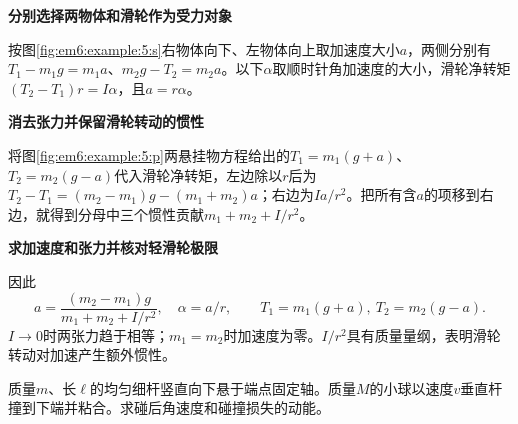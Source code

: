 \begin{solution}\textbf{分别选择两物体和滑轮作为受力对象}\par\nobreak
按图\ref{fig:em6:example:5:s}右物体向下、左物体向上取加速度大小$a$，两侧分别有$T_1-m_1g=m_1a$、$m_2g-T_2=m_2a$。以下$\alpha$取顺时针角加速度的大小，滑轮净转矩$(T_2-T_1)r=I\alpha$，且$a=r\alpha$。



\par\medskip{}\noindent\textbf{消去张力并保留滑轮转动的惯性}\par\nobreak
将图\ref{fig:em6:example:5:p}两悬挂物方程给出的$T_1=m_1(g+a)$、$T_2=m_2(g-a)$代入滑轮净转矩，左边除以$r$后为$T_2-T_1=(m_2-m_1)g-(m_1+m_2)a$；右边为$I a/r^2$。把所有含$a$的项移到右边，就得到分母中三个惯性贡献$m_1+m_2+I/r^2$。



\par\medskip{}\noindent\textbf{求加速度和张力并核对轻滑轮极限}\par\nobreak
因此
\[\boxed{a=\frac{(m_2-m_1)g}{m_1+m_2+I/r^2},\quad\alpha=a/r},\qquad\boxed{T_1=m_1(g+a),\ T_2=m_2(g-a)}.\]
$I\to0$时两张力趋于相等；$m_1=m_2$时加速度为零。$I/r^2$具有质量量纲，表明滑轮转动对加速产生额外惯性。\end{solution}
\begin{question}\begin{example}[弹丸粘在悬杆末端]\label{em6:example:6}
质量$m$、长$\ell$的均匀细杆竖直向下悬于端点固定轴。质量$M$的小球以速度$v$垂直杆撞到下端并粘合。求碰后角速度和碰撞损失的动能。
\end{example}
\end{question}
